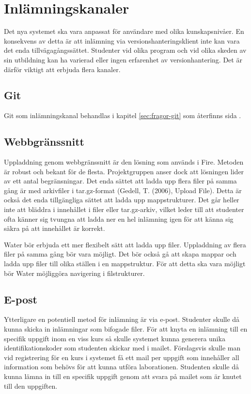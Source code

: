 \section{Inlämningskanaler}

Det nya systemet ska vara anpassat för användare med olika kunskapsnivåer. En konsekvens av detta är att inlämning via versionshanteringsklient inte kan vara det enda tillvägagångssättet. Studenter vid olika program och vid olika skeden av sin utbildning kan ha varierad eller ingen erfarenhet av versionhantering. Det är därför viktigt att erbjuda flera kanaler.

\subsection{Git}
Git som inlämningskanal behandlas i kapitel \ref{sec:fragor-git} som återfinns sida \pageref{sec:fragor-git}.

\subsection{Webbgränssnitt}
Uppladdning genom webbgränssnitt är den lösning som används i Fire. Metoden är robust och bekant för de flesta. Projektgruppen anser dock att lösningen lider av ett antal begränsningar. Det enda sättet att ladda upp flera filer på samma gång är med arkivfiler i tar.gz-format (Gedell, T. (2006), Upload File). Detta är också det enda tillgängliga sättet att ladda upp mappstrukturer. Det går heller inte att bläddra i innehållet i filer eller tar.gz-arkiv, vilket leder till att studenter ofta känner sig tvungna att ladda ner en hel inlämning igen för att känna sig säkra på att innehållet är korrekt.

Water bör erbjuda ett mer flexibelt sätt att ladda upp filer. Uppladdning av flera filer på samma gång bör vara möjligt. Det bör också gå att skapa mappar och ladda upp filer till olika ställen i en mappstruktur. För att detta ska vara möjligt bör Water möjliggöra navigering i filstrukturer.

\subsection{E-post}
Ytterligare en potentiell metod för inlämning är via e-post. Studenter skulle då kunna skicka in inlämningar som bifogade filer. För att knyta en inlämning till en specifik uppgift inom en viss kurs så skulle systemet kunna generera unika identifikationskoder som studenten skickar med i mailet. Förslagsvis skulle man vid registrering för en kurs i systemet få ett mail per uppgift som innehåller all information som behövs för att kunna utföra laborationen. Studenten skulle då kunna lämna in till en specifik uppgift genom att svara på mailet som är knutet till den uppgiften.

